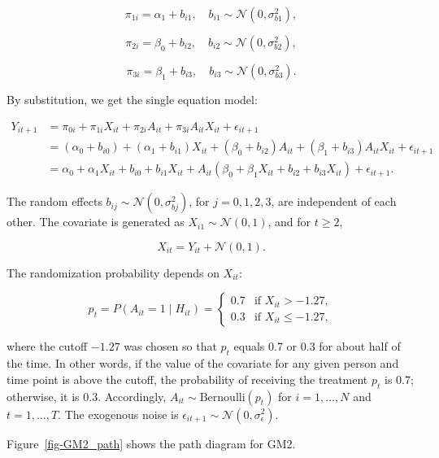 \documentclass[
  12pt,
  a4paper,
]{article}
\begin{document}
\[
\pi_{1i} = \alpha_1 + b_{i1}, \quad b_{i1} \sim \mathcal{N}(0, \sigma_{b1}^2),
\]

\[
\pi_{2i} = \beta_0 + b_{i2}, \quad b_{i2} \sim \mathcal{N}(0, \sigma_{b2}^2),
\]

\[
\pi_{3i} = \beta_1 + b_{i3}, \quad b_{i3} \sim \mathcal{N}(0, \sigma_{b3}^2).
\]

By substitution, we get the single equation model:

\[
\begin{aligned}
Y_{it+1} &= \pi_{0i} + \pi_{1i} X_{it} + \pi_{2i} A_{it} + \pi_{3i} A_{it} X_{it} + \epsilon_{it+1} \\ 
&= (\alpha_0 + b_{i0}) + (\alpha_1 + b_{i1}) X_{it} + (\beta_0 + b_{i2}) A_{it} + (\beta_1 + b_{i3}) A_{it} X_{it} + \epsilon_{it+1} \\ 
&= \alpha_0 + \alpha_1 X_{it} + b_{i0} + b_{i1} X_{it} + A_{it} \left( \beta_0 + \beta_1 X_{it} + b_{i2} + b_{i3} X_{it} \right) + \epsilon_{it+1}.
\end{aligned}
\]

The random effects \(b_{ij} \sim \mathcal{N}(0, \sigma_{bj}^2)\), for
\(j = 0, 1, 2, 3\), are independent of each other. The covariate is
generated as \(X_{i1} \sim \mathcal{N}(0, 1)\), and for \(t \geq 2\),

\[
X_{it} = Y_{it} + \mathcal{N}(0, 1).
\]

The randomization probability depends on \(X_{it}\):

\[
p_t = P(A_{it} = 1 \mid H_{it}) = 
\begin{cases} 
0.7 & \text{if } X_{it} > -1.27, \\
0.3 & \text{if } X_{it} \leq -1.27,
\end{cases}
\]

where the cutoff \(-1.27\) was chosen so that \(p_t\) equals 0.7 or 0.3
for about half of the time. In other words, if the value of the
covariate for any given person and time point is above the cutoff, the
probability of receiving the treatment \(p_t\) is 0.7; otherwise, it is
0.3. Accordingly, \(A_{it} \sim \text{Bernoulli}(p_t)\) for
\(i = 1, \ldots, N\) and \(t = 1, \ldots, T\). The exogenous noise is
\(\epsilon_{it+1} \sim \mathcal{N}(0, \sigma_\epsilon^2)\).

Figure~\ref{fig-GM2_path} shows the path diagram for GM2.
\end{document}
